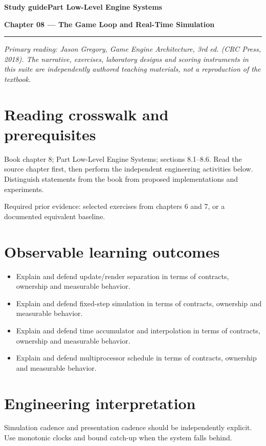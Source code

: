 \documentclass[11pt,letterpaper]{article}
\newcommand{\DocType}{Reference}
\newcommand{\SuiteHeading}[3]{%
\renewcommand{\DocType}{#2}%
{\small\bfseries\sffamily\color{EngineTeal}#2\hfill #3}\par\vspace{6pt}
{\LARGE\bfseries\color{EngineBlue}#1}\par\vspace{4pt}
{\color{EngineTeal}\rule{\linewidth}{1pt}}\par\vspace{7pt}}
\newcommand{\SourceNote}{\footnotesize\textit{Primary reading: Jason Gregory, \emph{Game Engine Architecture}, 3rd ed. (CRC Press, 2018). The narrative, exercises, laboratory designs and scoring instruments in this suite are independently authored teaching materials, not a reproduction of the textbook.}\normalsize\par}
\begin{document}
\SuiteHeading{Chapter 08 — The Game Loop and Real-Time Simulation}{Study guide}{Part Low-Level Engine Systems}
\SourceNote
\section{Reading crosswalk and prerequisites}
Book chapter 8; Part Low-Level Engine Systems; sections 8.1--8.6. Read the source chapter first, then perform the independent engineering activities below. Distinguish statements from the book from proposed implementations and experiments.

Required prior evidence: selected exercises from chapters 6 and 7, or a documented equivalent baseline.

\section{Observable learning outcomes}
\begin{itemize}
\item Explain and defend update/render separation in terms of contracts, ownership and measurable behavior.
\item Explain and defend fixed-step simulation in terms of contracts, ownership and measurable behavior.
\item Explain and defend time accumulator and interpolation in terms of contracts, ownership and measurable behavior.
\item Explain and defend multiprocessor schedule in terms of contracts, ownership and measurable behavior.
\end{itemize}
\section{Engineering interpretation}
Simulation cadence and presentation cadence should be independently explicit. Use monotonic clocks and bound catch-up when the system falls behind.
\end{document}
